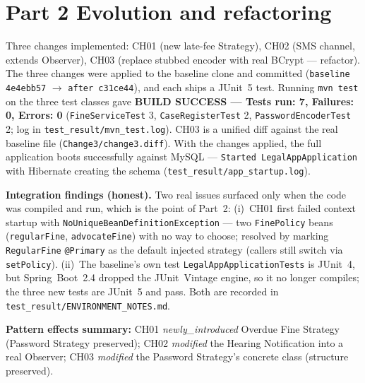 \documentclass[11pt,a4paper]{article}
\begin{document}
\section{Part 2 Evolution and refactoring}
Three changes implemented: CH01 (new late-fee Strategy), CH02 (SMS channel, extends Observer), CH03 (replace stubbed encoder with real BCrypt --- refactor). The three changes were applied to the baseline clone and committed (\texttt{baseline 4e4ebb57} $\rightarrow$ \texttt{after c31ce44}), and each ships a JUnit~5 test. Running \texttt{mvn test} on the three test classes gave \textbf{BUILD SUCCESS --- Tests run: 7, Failures: 0, Errors: 0} (\texttt{FineServiceTest} 3, \texttt{CaseRegisterTest} 2, \texttt{PasswordEncoderTest} 2; log in \texttt{test\_result/mvn\_test.log}). CH03 is a unified diff against the real baseline file (\texttt{Change3/change3.diff}). With the changes applied, the full application boots successfully against MySQL --- \texttt{Started LegalAppApplication} with Hibernate creating the schema (\texttt{test\_result/app\_startup.log}).\par
\textbf{Integration findings (honest).} Two real issues surfaced only when the code was compiled and run, which is the point of Part~2: (i)~CH01 first failed context startup with \texttt{NoUniqueBeanDefinitionException} --- two \texttt{FinePolicy} beans (\texttt{regularFine}, \texttt{advocateFine}) with no way to choose; resolved by marking \texttt{RegularFine} \texttt{@Primary} as the default injected strategy (callers still switch via \texttt{setPolicy}). (ii)~The baseline's own test \texttt{LegalAppApplicationTests} is JUnit~4, but Spring~Boot~2.4 dropped the JUnit~Vintage engine, so it no longer compiles; the three new tests are JUnit~5 and pass. Both are recorded in \texttt{test\_result/ENVIRONMENT\_NOTES.md}.\par
\textbf{Pattern effects summary:} CH01 \emph{newly\_introduced} Overdue Fine Strategy (Password Strategy preserved); CH02 \emph{modified} the Hearing Notification into a real Observer; CH03 \emph{modified} the Password Strategy's concrete class (structure preserved).\par
\end{document}
